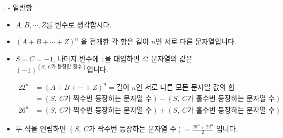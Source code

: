 \begin{frame}{\probno{}. \probtitle{} - 일반항}
    \begin{itemize}
        \item $A, B, \cdots, Z$를 변수로 생각합시다.
        \item $(A+B+\cdots+Z)^n$ 을 전개한 각 항은 길이 $n$인 서로 다른 문자열입니다.
        \item $S = C = -1$, 나머지 변수에 $1$을 대입하면 각 문자열의 값은 ${(-1)}^{(S,\ C\textrm{가 등장한 횟수})}$입니다.
        \vspace{-10.5mm}
        \begin{align*}
            22^n & = (A+B+\cdots+Z)^n = \textrm{길이 }n\textrm{인 서로 다른 모든 문자열 값의 합} \\
            & = (S,\ C\textrm{가 짝수번 등장하는 문자열 수}) - (S,\ C\textrm{가 홀수번 등장하는 문자열 수}) \\
        26^n &= (S,\ C\textrm{가 짝수번 등장하는 문자열 수}) + (S,\ C\textrm{가 홀수번 등장하는 문자열 수})
        \end{align*}
        \vspace{-8mm}
        \item 두 식을 연립하면 $(S,\ C\textrm{가 짝수번 등장하는 문자열 수}) = \frac{26^n+22^n}{2}$ 입니다.
    \end{itemize}
\end{frame}
